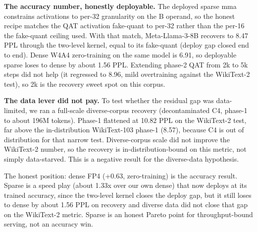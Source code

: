 \documentclass[
]{article}
\begin{document}
\textbf{The accuracy number, honestly deployable.} The deployed sparse
mma constrains activations to per-32 granularity on the B operand, so
the honest recipe matches the QAT activation fake-quant to per-32 rather
than the per-16 the fake-quant ceiling used. With that match,
Meta-Llama-3-8B recovers to 8.47 PPL through the two-level kernel, equal
to its fake-quant (deploy gap closed end to end). Dense W4A4
zero-training on the same model is 6.91, so deployable sparse loses to
dense by about 1.56 PPL. Extending phase-2 QAT from 2k to 5k steps did
not help (it regressed to 8.96, mild overtraining against the WikiText-2
test), so 2k is the recovery sweet spot on this corpus.

\textbf{The data lever did not pay.} To test whether the residual gap
was data-limited, we ran a full-scale diverse-corpus recovery
(decontaminated C4, phase-1 to about 196M tokens). Phase-1 flattened at
10.82 PPL on the WikiText-2 test, far above the in-distribution
WikiText-103 phase-1 (8.57), because C4 is out of distribution for that
narrow test. Diverse-corpus scale did not improve the WikiText-2 number,
so the recovery is in-distribution-bound on this metric, not simply
data-starved. This is a negative result for the diverse-data hypothesis.

The honest position: dense FP4 (+0.63, zero-training) is the accuracy
result. Sparse is a speed play (about 1.33x over our own dense) that now
deploys at its trained accuracy, since the two-level kernel closes the
deploy gap, but it still loses to dense by about 1.56 PPL on recovery
and diverse data did not close that gap on the WikiText-2 metric. Sparse
is an honest Pareto point for throughput-bound serving, not an accuracy
win.
\end{document}

